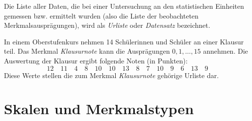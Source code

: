 \documentclass{lecture}
\begin{document}
    Die Liste aller Daten, die bei einer Untersuchung an den statistischen Einheiten gemessen bzw. ermittelt wurden (also die Liste der beobachteten Merkmalsausprägungen), wird als \emph{Urliste} oder \emph{Datensatz} bezeichnet.
    \begin{example}
        In einem Oberstufenkurs nehmen 14 Schülerinnen und Schüler an einer Klausur teil.
        Das Merkmal \emph{Klausurnote} kann die Ausprägungen \(0, 1, \ldots, 15\) annehmen.
        Die Auswertung der Klausur ergibt folgende Noten (in Punkten):
        \[
            12 \quad 11 \quad 4 \quad 8 \quad 10 \quad 10 \quad 13 \quad 8 \quad 7 \quad 10 \quad 9 \quad 6 \quad 13 \quad 9
        \]
        Diese Werte stellen die zum Merkmal \emph{Klausurnote} gehörige Urliste dar.
    \end{example}


    \section*{Skalen und Merkmalstypen}
\end{document}
